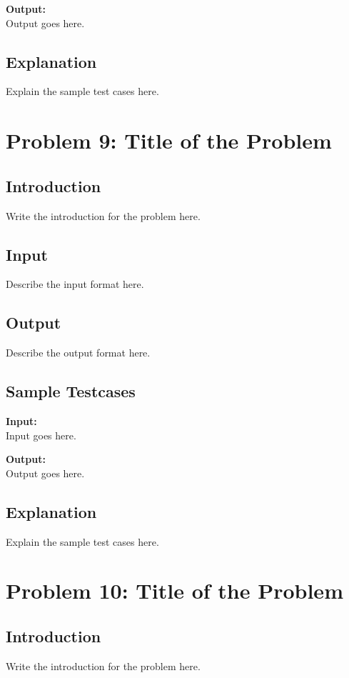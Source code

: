 \documentclass[12pt]{article}
\begin{document}
\textbf{Output:} \\
Output goes here.

\subsection*{Explanation}
Explain the sample test cases here.

\newpage

\section*{Problem 9: Title of the Problem}

\subsection*{Introduction}
Write the introduction for the problem here.

\subsection*{Input}
Describe the input format here.

\subsection*{Output}
Describe the output format here.

\subsection*{Sample Testcases}
\textbf{Input:} \\
Input goes here.

\textbf{Output:} \\
Output goes here.

\subsection*{Explanation}
Explain the sample test cases here.

\newpage

\section*{Problem 10: Title of the Problem}

\subsection*{Introduction}
Write the introduction for the problem here.
\end{document}
